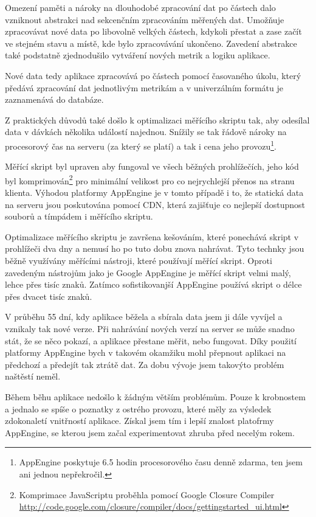 \documentclass[bc,female,java,dept456]{diploma}						%
\begin{document}
Omezení paměti a nároky na dlouhodobé zpracování dat po částech dalo vzniknout abstrakci nad sekcenčním zpracováním měřených dat. Umožňuje zpracovávat nové data po libovolně velkých částech, kdykoli přestat a zase začít ve stejném stavu a místě, kde bylo zpracovávání ukončeno. Zavedení abstrakce také podstatně zjednodušilo vytváření nových metrik a logiku aplikace.

Nové data tedy aplikace zpracovává po částech pomocí časovaného úkolu, který předává zpracování dat jednotlivým metrikám a v univerzálním formátu je zaznamenává do databáze.

Z praktických důvodů také došlo k optimalizaci měřícího skriptu tak, aby odesílal data v dávkách několika událostí najednou. Snížily se tak řádově nároky na procesorový čas na serveru (za který se platí) a tak i cena jeho provozu\footnote{AppEngine poskytuje 6.5 hodin procesorového času denně zdarma, ten jsem ani jednou nepřekročil.}.

Měřící skript byl upraven aby fungoval ve všech běžných prohlížečích, jeho kód byl komprimován\footnote{Komprimace JavaScriptu proběhla pomocí Google Closure Compiler \url{http://code.google.com/closure/compiler/docs/gettingstarted_ui.html}} pro minimální velikost pro co nejrychlejší přenos na stranu klienta. Výhodou platformy AppEngine je v tomto případě i to, že statická data na serveru jsou poskutována pomocí CDN, která zajišťuje co nejlepší dostupnost souborů a tímpádem i měřícího skriptu.

Optimalizace měřícího skriptu je završena kešováním, které ponechává skript v prohlížeči dva dny a nemusí ho po tuto dobu znova nahrávat. Tyto technky jsou běžně využívány měřícími nástroji, které používají měřící skript. Oproti zavedeným nástrojům jako je Google AppEngine je měřící skript velmi malý, lehce přes tisíc znaků. Zatímco sofistikovanjší AppEngine používá skript o délce přes dvacet tisíc znaků.

V průběhu 55 dní, kdy aplikace běžela a sbírala data jsem ji dále vyvíjel a vznikaly tak nové verze. Při nahrávání nových verzí na server se může snadno stát, že se něco pokazí, a aplikace přestane měřit, nebo fungovat. Díky použití platformy AppEngine bych v  takovém okamžiku mohl přepnout aplikaci na předchozí a předejít tak ztrátě dat. Za dobu vývoje jsem takovýto problém naštěstí neměl.

Během běhu aplikace nedošlo k žádným větším problémům. Pouze k krobnostem a jednalo se spíše o poznatky z ostrého provozu, které měly za výsledek zdokonaletí vnitřností aplikace. Získal jsem tím i lepší znalost platofrmy AppEngine, se kterou jsem začal experimentovat zhruba před necelým rokem.
\end{document}
